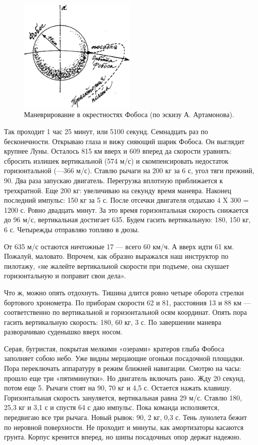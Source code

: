 \documentclass[11pt,a4paper,oneside]{article}
\begin{document}
\begin{figure}[H]
\includegraphics[width=0.5\textwidth]{fobos2}
\caption{Маневрирование в окрестностях Фобоса (по эскизу А. Артамонова).}
\end{figure}

Так проходит 1 час 25 минут, или 5100 секунд. Семнадцать раз по бесконечности. Открываю глаза и вижу сияющий шарик Фобоса. Он выглядит крупнее Луны. Осталось 815 км вверх и 609 вперед да скорости уравнять: сбросить излишек вертикальной (574 м/с) и скомпенсировать недостаток горизонтальной (—366 м/с). Ставлю рычаги на 200 кг за 6 с, угол тяги прежний, 90\degree. Два раза запускаю двигатель. Перегрузка вплотную приближается к трехкратной. Еще 200 кг: увеличиваю на секунду время маневра. Наконец последний импульс: 150 кг за 5 с. После отсечки двигателя отдыхаю 4 X 300 = 1200 с. Ровно двадцать минут. За это время горизонтальная скорость снижается до 96 м/с, вертикальная достигает 635. Будем гасить вертикальную: 180\degree, 150 кг, 6 с. Четырежды отправляю топливо в дюзы.

От 635 м/с остаются ничтожные 17 — всего 60 км/ч. А вверх идти 61 км. Пожалуй, маловато. Впрочем, как образно выражался наш инструктор по пилотажу, «не жалейте вертикальной скорости при подъеме, она скушает горизонтальную и поправит свои дела».

Что ж, можно опять отдохнуть. Тишина длится ровно четыре оборота стрелки бортового хронометра. По приборам скорости 62 и 81, расстояния 13 и 88 км — соответственно по вертикальной и горизонтальной осям координат. Опять пора гасить вертикальную скорость: 180\degree, 60 кг, 3 с. По завершении маневра разворачиваю суденышко вверх носом.

Серая, бугристая, покрытая мелкими «озерами» кратеров глыба Фобоса заполняет собою небо. Уже видны мерцающие огоньки посадочной площадки. Пора переключать аппаратуру в режим ближней навигации. Смотрю на часы: прошло еще три «пятиминутки». Но двигатель включать рано. Жду 20 секунд, потом еще 5. Рычаги стоят на 90\degree, 70 кг и 4,5 с. Остается нажать клавишу. Горизонтальная скорость зануляется, вертикальная равна 29 м/с. Ставлю 180\degree, 25,3 кг и 3,1 с и спустя 64 с даю импульс. Пока команда исполняется, передвигаю все три рычага. Новый рывок: 90\degree, 2 кг, 0,3 с. Тень лунолета бежит по неровной поверхности. Не проходит и минуты, как амортизаторы касаются грунта. Корпус кренится вперед, но шипы посадочных опор держат надежно.
\end{document}
